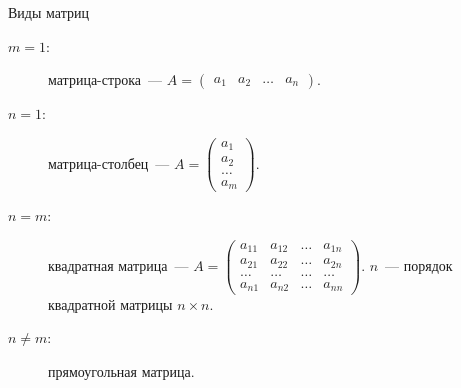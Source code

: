 \documentclass[unicode,11pt,notheorems]{beamer}
\begin{document}
\begin{frame}{Виды матриц}
	\begin{description}
	\item[$m=1$:] 
		\alert{матрица-строка}~---
		$A = \begin{pmatrix}
			a_1 & a_2 & \ldots & a_n
		\end{pmatrix}$.
	\item[$n=1$:]
		\alert{матрица-столбец}~---
		$A = \begin{pmatrix} 
			a_1 \\ a_2 \\ \ldots \\ a_m 
		\end{pmatrix}$.
	\item[$n=m$:] 
		\alert{квадратная} матрица~---
		$A = \begin{pmatrix}
			a_{11} & a_{12} & \ldots & a_{1n} \\
			a_{21} & a_{22} & \ldots & a_{2n} \\
			\ldots & \ldots & \ldots &\ldots \\
			a_{n1} & a_{n2} & \ldots & a_{nn}
		\end{pmatrix}$.
		$n$~--- порядок квадратной матрицы $n\times n$.
	\item[$n\neq m$:] 
		\alert{прямоугольная} матрица.		
	\end{description}
\end{frame}
\end{document}
